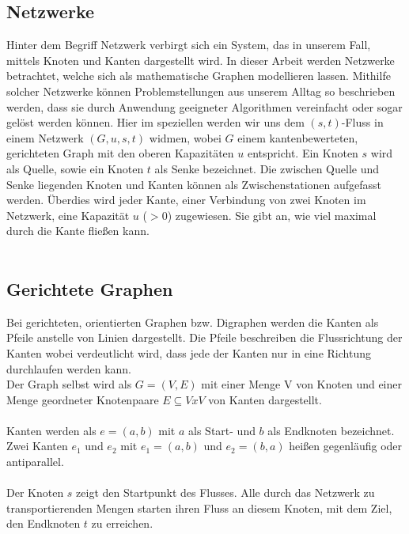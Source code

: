 \documentclass[a4paper]{llncs}
\begin{document}
\subsection{Netzwerke}
\label{Netzwerke}
Hinter dem Begriff Netzwerk verbirgt sich ein System, das in unserem Fall, mittels Knoten und Kanten dargestellt wird. In dieser Arbeit werden Netz\-werke betrachtet, welche sich als mathematische Graphen modellieren lassen. Mithilfe solcher Netzwerke können Problemstellungen aus unserem Alltag so beschrieben werden, dass sie durch Anwendung geeigneter Algorithmen ver\-einfacht oder sogar gelöst werden können. Hier im speziellen werden wir uns dem $(s,t)$-Fluss in einem Netzwerk $(G,u,s,t)$ widmen, wobei  $G$ einem kanten\-bewerteten, gerichteten Graph mit den oberen Kapazitäten $u$ entspricht. Ein Knoten $s$ wird als Quelle, sowie ein Knoten $t$ als Senke bezeichnet. Die zwischen Quelle und Senke liegenden Knoten und Kanten können als Zwischenstationen aufgefasst werden. Überdies wird jeder Kante, einer Verbindung von zwei Knoten im Netzwerk, eine Kapazität $u$ ($>0$) zugewiesen. Sie gibt an, wie viel maximal durch die Kante fließen kann.\\ \\
\citep{Optimierungsmodell}

\subsection{Gerichtete Graphen}
\label{Graph}
Bei gerichteten, orientierten Graphen bzw. Digraphen werden die Kanten als Pfeile anstelle von Linien dargestellt. Die Pfeile beschreiben die Flussrichtung der Kanten wobei verdeutlicht wird, dass jede der Kanten nur in eine Richtung durchlaufen werden kann.\\

Der Graph selbst wird als
$G = (V,E)$ mit einer Menge V von Knoten und einer Menge
geordneter Knotenpaare $E \subseteq V x V$ von Kanten dargestellt.\\ \\
Kanten werden als 
$e = (a,b)$
mit $a$ als Start- und $b$ als Endknoten bezeichnet.
Zwei Kanten $e_{1}$ und $e_{2}$ mit 
$e_{1} = (a,b)$ und $e_{2} = (b,a)$
heißen gegenläufig oder antiparallel.\\ \\
Der Knoten $s$ zeigt den Startpunkt des Flusses. Alle durch das Netzwerk zu transportierenden Mengen starten ihren Fluss an diesem Knoten, mit dem Ziel, den Endknoten $t$ zu erreichen.\\ 
\end{document}
